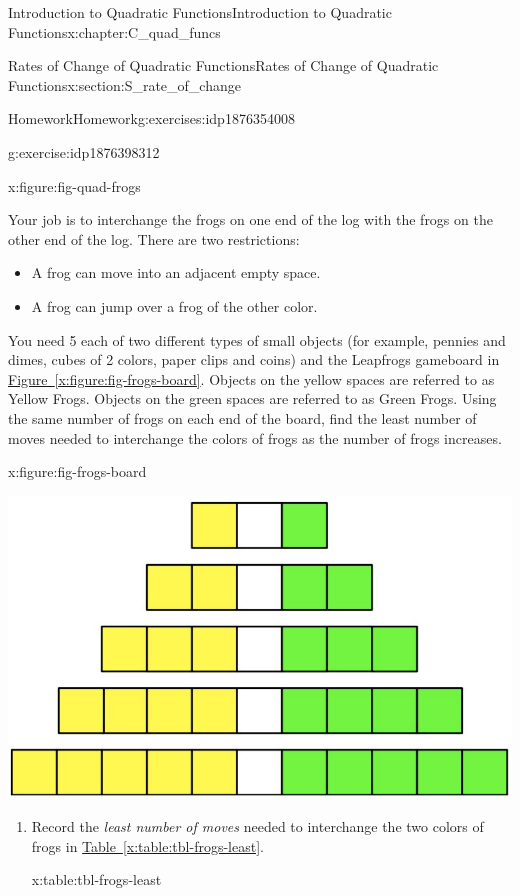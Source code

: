 \documentclass[oneside,10pt,]{book}
\newcommand{\xreffont}{\relax}
\numberwithin{equation}{chapter}
\begin{document}
\begin{chapterptx}{Introduction to Quadratic Functions}{}{Introduction to Quadratic Functions}{}{}{x:chapter:C_quad_funcs}
\begin{sectionptx}{Rates of Change of Quadratic Functions}{}{Rates of Change of Quadratic Functions}{}{}{x:section:S_rate_of_change}
\begin{exercises-subsection}{Homework}{}{Homework}{}{}{g:exercises:idp1876354008}
\begin{divisionexercise}{3}{}{}{g:exercise:idp1876398312}
\begin{figureptx}{}{x:figure:fig-quad-frogs}{}
\begin{image}{0.05}{0.9}{0.05}
\end{image}%
\tcblower
\end{figureptx}%
Your job is to interchange the frogs on one end of the log with the frogs on the other end of the log. There are two restrictions:%
\begin{itemize}[label=\textbullet]
\item{}A frog can move into an adjacent empty space.%
\item{}A frog can jump over a frog of the other color.%
\end{itemize}
You need 5 each of two different types of small objects (for example, pennies and dimes, cubes of 2 colors, paper clips and coins) and the Leapfrogs gameboard in \hyperref[x:figure:fig-frogs-board]{Figure~{\xreffont\ref{x:figure:fig-frogs-board}}}. Objects on the yellow spaces are referred to as Yellow Frogs. Objects on the green spaces are referred to as Green Frogs. Using the same number of frogs on each end of the board, find the least number of moves needed to interchange the colors of frogs as the number of frogs increases.%
\begin{figureptx}{}{x:figure:fig-frogs-board}{}%
\begin{image}{0.15}{0.7}{0.15}%
\includegraphics[width=\linewidth]{external/frogs-board.pdf}
\end{image}%
\tcblower
\end{figureptx}%
\begin{enumerate}[font=\bfseries,label=(\alph*),ref=\alph*]
\item{}Record the \emph{least number of moves} needed to interchange the two colors of frogs in \hyperref[x:table:tbl-frogs-least]{Table~{\xreffont\ref{x:table:tbl-frogs-least}}}.%
\begin{tableptx}{\textbf{}}{x:table:tbl-frogs-least}{}%

\end{tableptx}
\end{enumerate}
\end{divisionexercise}
\end{exercises-subsection}
\end{sectionptx}
\end{chapterptx}
\end{document}
